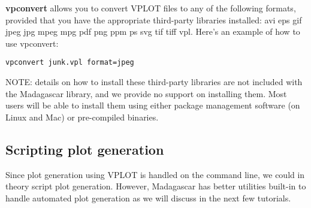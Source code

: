 \textbf{vpconvert} allows you to convert VPLOT files to any of the following formats, provided that you have the appropriate third-party libraries installed: avi eps gif jpeg jpg mpeg mpg pdf png ppm ps svg tif tiff vpl.  Here's an example of how to use vpconvert:
\begin{verbatim}
vpconvert junk.vpl format=jpeg
\end{verbatim}

NOTE: details on how to install these third-party libraries are not included with the Madagascar library, and we provide no support on installing them.  Most users will be able to install them using either package management software (on Linux and Mac) or pre-compiled binaries.

\subsection{Scripting plot generation}

Since plot generation using VPLOT is handled on the command line, we could in theory script plot generation.  However, Madagascar has better utilities built-in to handle automated plot generation as we will discuss in the next few tutorials.
